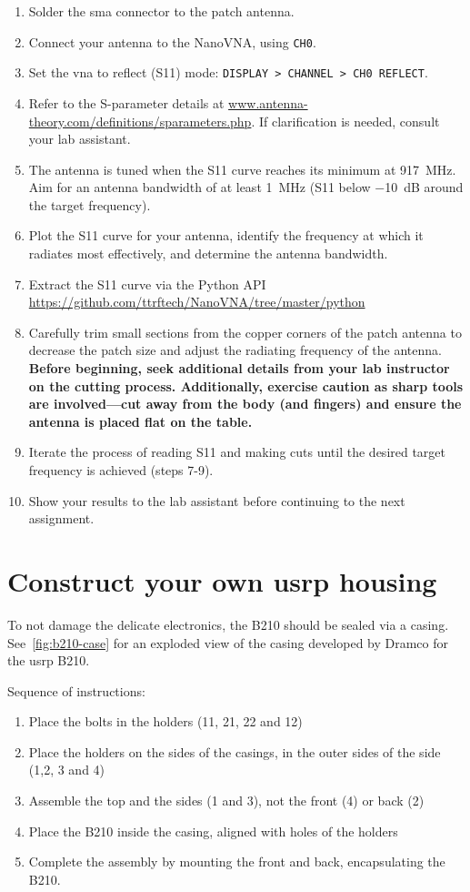 \begin{enumerate}
\begin{itemize}
    \end{itemize}
    \item Solder the \gls{sma} connector to the patch antenna.
    \item  Connect your antenna to the NanoVNA, using \texttt{CH0}.
    \item Set the \gls{vna} to reflect (S11) mode: \texttt{DISPLAY > CHANNEL > CH0 REFLECT}.
    \item Refer to the S-parameter details at \url{www.antenna-theory.com/definitions/sparameters.php}. If clarification is needed, consult your lab assistant.
    \item The antenna is tuned when the S11 curve reaches its minimum at \SI{917}{\mega\hertz}. Aim for an antenna bandwidth of at least \SI{1}{\mega\hertz} (S11 below \SI{-10}{dB} around the target frequency).
\item Plot the S11 curve for your antenna, identify the frequency at which it radiates most effectively, and determine the antenna bandwidth.
\item Extract the S11 curve via the Python API \url{https://github.com/ttrftech/NanoVNA/tree/master/python}
\item Carefully trim small sections from the copper corners of the patch antenna to decrease the patch size and adjust the radiating frequency of the antenna. \textbf{Before beginning, seek additional details from your lab instructor on the cutting process. Additionally, exercise caution as sharp tools are involved—cut away from the body (and fingers) and ensure the antenna is placed flat on the table.}
\item Iterate the process of reading S11 and making cuts until the desired target frequency is achieved (steps 7-9).
\item Show your results to the lab assistant before continuing to the next assignment.
\end{enumerate}


\section{Construct your own \gls{usrp} housing}
To not damage the delicate electronics, the B210 should be sealed via a casing. See~\cref{fig:b210-case} for an exploded view of the casing developed by Dramco for the \gls{usrp} B210. 

Sequence of instructions:
\begin{enumerate}
    \item Place the bolts in the holders (11, 21, 22 and 12)
    \item Place the holders on the sides of the casings, in the outer sides of the side (1,2, 3 and 4)
    \item Assemble the top and the sides (1 and 3), not the front (4) or back (2)
    \item Place the B210 inside the casing, aligned with holes of the holders
    \item Complete the assembly by mounting the front and back, encapsulating the B210.
\end{enumerate}

